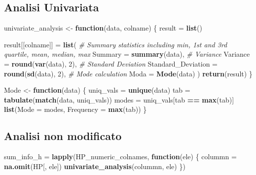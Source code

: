 \documentclass[
]{article}
\newenvironment{Shaded}{\begin{snugshade}}{\end{snugshade}}
\newcommand{\AttributeTok}[1]{\textcolor[rgb]{0.13,0.29,0.53}{#1}}
\newcommand{\CommentTok}[1]{\textcolor[rgb]{0.56,0.35,0.01}{\textit{#1}}}
\newcommand{\ControlFlowTok}[1]{\textcolor[rgb]{0.13,0.29,0.53}{\textbf{#1}}}
\newcommand{\DecValTok}[1]{\textcolor[rgb]{0.00,0.00,0.81}{#1}}
\newcommand{\FunctionTok}[1]{\textcolor[rgb]{0.13,0.29,0.53}{\textbf{#1}}}
\newcommand{\NormalTok}[1]{#1}
\newcommand{\OtherTok}[1]{\textcolor[rgb]{0.56,0.35,0.01}{#1}}
\newcommand{\SpecialCharTok}[1]{\textcolor[rgb]{0.81,0.36,0.00}{\textbf{#1}}}
\begin{document}
\subsection{Analisi Univariata}\label{analisi-univariata}

\begin{Shaded}
\begin{Highlighting}[]
\NormalTok{univariate\_analysis }\OtherTok{\textless{}{-}} \ControlFlowTok{function}\NormalTok{(data, colname) \{}
\NormalTok{  result }\OtherTok{=} \FunctionTok{list}\NormalTok{()}
  
\NormalTok{  result[[colname]] }\OtherTok{=} \FunctionTok{list}\NormalTok{(}
    \CommentTok{\# Summary statistics including min, 1st and 3rd quartile, mean, median, max}
    \AttributeTok{Summary =} \FunctionTok{summary}\NormalTok{(data),}
    \CommentTok{\# Variance}
    \AttributeTok{Variance =} \FunctionTok{round}\NormalTok{(}\FunctionTok{var}\NormalTok{(data), }\DecValTok{2}\NormalTok{),}
    \CommentTok{\# Standard Deviation}
    \AttributeTok{Standard\_Deviation =} \FunctionTok{round}\NormalTok{(}\FunctionTok{sd}\NormalTok{(data), }\DecValTok{2}\NormalTok{),}
    \CommentTok{\# Mode calculation}
    \AttributeTok{Moda =} \FunctionTok{Mode}\NormalTok{(data)}
\NormalTok{  )}
  \FunctionTok{return}\NormalTok{(result)}
\NormalTok{\}}

\NormalTok{Mode }\OtherTok{\textless{}{-}} \ControlFlowTok{function}\NormalTok{(data) \{}
\NormalTok{  uniq\_vals }\OtherTok{=} \FunctionTok{unique}\NormalTok{(data)}
\NormalTok{  tab }\OtherTok{=} \FunctionTok{tabulate}\NormalTok{(}\FunctionTok{match}\NormalTok{(data, uniq\_vals))}
\NormalTok{  modes }\OtherTok{=}\NormalTok{ uniq\_vals[tab }\SpecialCharTok{==} \FunctionTok{max}\NormalTok{(tab)]}
  \FunctionTok{list}\NormalTok{(}\AttributeTok{Mode =}\NormalTok{ modes, }\AttributeTok{Frequency =} \FunctionTok{max}\NormalTok{(tab))}
\NormalTok{\}}
\end{Highlighting}
\end{Shaded}

\subsection{Analisi non modificato}\label{analisi-non-modificato}

\begin{Shaded}
\begin{Highlighting}[]
\NormalTok{sum\_info\_h }\OtherTok{=} \FunctionTok{lapply}\NormalTok{(HP\_numeric\_colnames, }\ControlFlowTok{function}\NormalTok{(ele) \{}
\NormalTok{  colummn }\OtherTok{=} \FunctionTok{na.omit}\NormalTok{(HP[, ele])}
  \FunctionTok{univariate\_analysis}\NormalTok{(colummn, ele)}
\NormalTok{\})}
\end{Highlighting}
\end{Shaded}
\end{document}
